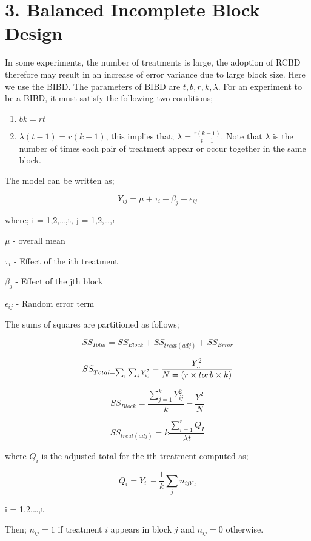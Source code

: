 \documentclass[
]{article}
\begin{document}
\newpage

\hypertarget{balanced-incomplete-block-design}{%
\section{3. Balanced Incomplete Block
Design}\label{balanced-incomplete-block-design}}

In some experiments, the number of treatments is large, the adoption of
RCBD therefore may result in an increase of error variance due to large
block size. Here we use the BIBD. The parameters of BIBD are
\(t, b, r, k, \lambda\). For an experiment to be a BIBD, it must satisfy
the following two conditions;

\begin{enumerate}
\def\labelenumi{\arabic{enumi}.}
\item
  \(bk=rt\)
\item
  \(\lambda(t-1)=r(k-1)\), this implies that;
  \(\lambda=\frac{r(k-1)}{t-1}\). Note that \(\lambda\) is the number of
  times each pair of treatment appear or occur together in the same
  block.
\end{enumerate}

The model can be written as;

\[Y_{ij}=\mu+\tau_i+\beta_j+\epsilon_{ij}\]

where; i = 1,2,\ldots,t, j = 1,2,\ldots,r

\(\mu\) - overall mean

\(\tau_i\) - Effect of the ith treatment

\(\beta_j\) - Effect of the jth block

\(\epsilon_{ij}\) - Random error term

The sums of squares are partitioned as follows;

\[SS_{Total}=SS_{Block}+SS_{treat(adj)}+SS_{Error}\]

\[SS_{Total = \sum_i\sum_jY_{ij}^2}- \frac{Y_{..}^2}{N=(r\times t\space or\space b\times k)}\]

\[SS_{Block}=\frac{\sum_{j=1}^kY_{ij}^2}{k}-\frac{Y_{..}^2}{N}\]

\[SS_{treat(adj)}=k\frac{\sum_{i=1}^rQ_I}{\lambda t}\]

where \(Q_i\) is the adjusted total for the ith treatment computed as;

\[Q_i=Y_{i.}-\frac{1}{k}\sum_jn_{ijY_{.j}}\]

i = 1,2,\ldots,t

Then; \(n_{ij}=1\) if treatment \(i\) appears in block \(j\) and
\(n_{ij}=0\) otherwise.
\end{document}
